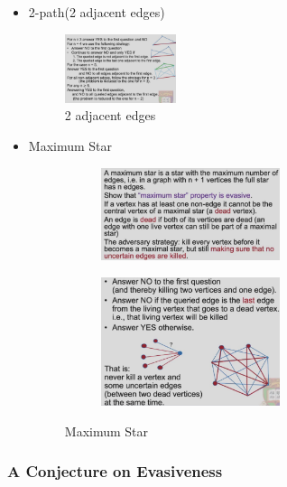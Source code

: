 \begin{itemize}
    \item 2-path(2 adjacent edges)
    \begin{figure}[H]
        \centering
        \includegraphics[width=0.309\textwidth]{pic/DAA5/2 adjacent edges}
        \caption{2 adjacent edges}
    \end{figure}
    \item Maximum Star
    \begin{figure}[H]
        \centering
        \begin{subfigure}{0.48\textwidth}
            \centering
            \includegraphics[width=0.618\textwidth]{pic/DAA5/Maximum Star1}
        \end{subfigure}
        \begin{subfigure}{0.48\textwidth}
            \centering
            \includegraphics[width=0.618\textwidth]{pic/DAA5/Maximum Star2}
        \end{subfigure}
        \caption{Maximum Star}
    \end{figure}
\end{itemize}

\subsubsection{A Conjecture on Evasiveness}

